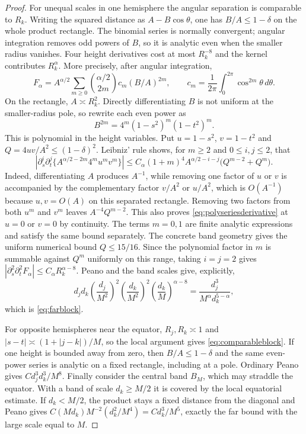 \documentclass[11pt]{amsart}
\begin{document}
\begin{proof}
For unequal scales in one hemisphere the angular separation is comparable
to $R_k$.  Writing the squared distance as $A-B\cos\theta$, one has
$B/A\le1-\delta$ on the whole product rectangle.  The binomial series is
normally convergent; angular integration removes odd powers of $B$, so it is
analytic even when the smaller radius vanishes.  Four height derivatives
cost at most $R_k^{-8}$ and the kernel contributes $R_k^\alpha$.  More
precisely, after angular integration,
\[
 F_\alpha=A^{\alpha/2}\sum_{m\ge0}
 \binom{\alpha/2}{2m}c_m(B/A)^{2m},
 \qquad c_m=\frac1{2\pi}\int_0^{2\pi}\cos^{2m}\theta\,d\theta.
\]
On the rectangle, $A\asymp R_k^2$.  Directly differentiating $B$ is not
uniform at the smaller-radius pole, so rewrite each even power as
\[
 B^{2m}=4^m(1-s^2)^m(1-t^2)^m.
\]
This is polynomial in the height variables.  Put
$u=1-s^2$, $v=1-t^2$ and $Q=4uv/A^2\le(1-\delta)^2$.  Leibniz' rule shows,
for $m\ge2$ and $0\le i,j\le2$, that
\begin{equation}\label{eq:polyseriesderivative}
 \left|\partial_s^i\partial_t^j
 \{A^{\alpha/2-2m}4^mu^mv^m\}\right|
 \le C_\alpha(1+m)^4
 A^{\alpha/2-i-j}\bigl(Q^{m-2}+Q^m\bigr).           \tag{5.8}
\end{equation}
Indeed, differentiating $A$ produces $A^{-1}$, while removing one factor
of $u$ or $v$ is accompanied by the complementary factor $v/A^2$ or
$u/A^2$, which is $O(A^{-1})$ because $u,v=O(A)$ on this separated
rectangle.  Removing two factors from both $u^m$ and $v^m$ leaves
$A^{-4}Q^{m-2}$.  This also proves
\eqref{eq:polyseriesderivative} at $u=0$ or $v=0$ by
continuity.  The terms $m=0,1$ are finite analytic expressions and satisfy
the same bound separately.  The concrete band geometry gives the uniform
numerical bound $Q\le15/16$.  Since the polynomial factor in $m$ is summable
against $Q^m$ uniformly on this range, taking $i=j=2$ gives
$|\partial_s^2\partial_t^2F_\alpha|\le C_\alpha R_k^{\alpha-8}$.
Peano and the band scales give, explicitly,
\[
 d_jd_k\left(\frac{d_j}{M^2}\right)^2
 \left(\frac{d_k}{M^2}\right)^2
 \left(\frac{d_k}{M}\right)^{\alpha-8}
 =\frac{d_j^3}{M^\alpha d_k^{5-\alpha}},
\]
which is \eqref{eq:farblock}.

For opposite hemispheres near the equator, $R_j,R_k\asymp1$ and
$|s-t|\asymp(1+|j-k|)/M$, so the local argument gives
\eqref{eq:comparableblock}.  If one height is bounded away from zero, then
$B/A\le1-\delta$ and the same even-power series is analytic on a fixed
rectangle, including at a pole.  Ordinary Peano gives
$Cd_j^3d_k^3/M^8$.  Finally consider the central band $B_M$, which may
straddle the equator.  With a band of scale $d_k\ge M/2$ it is covered by
the local equatorial estimate.  If $d_k<M/2$, the product stays a fixed
distance from the diagonal and Peano gives
$C(Md_k)M^{-2}(d_k^2/M^4)=Cd_k^3/M^5$, exactly the far bound with the large
scale equal to $M$.
\end{proof}
\end{document}

